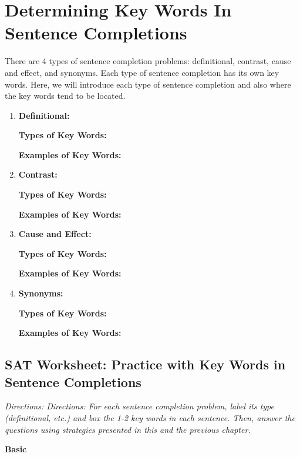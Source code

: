 \section{Determining Key Words In Sentence Completions}

There are 4 types of sentence completion problems: definitional, contrast, cause and effect, and
synonyms. Each type of sentence completion has its own key words. Here, we will introduce each
type of sentence completion and also where the key words tend to be located.

\begin{enumerate}

\vfill
\item \textbf{Definitional:}

\textbf{Types of Key Words:}

\textbf{Examples of Key Words:}

\vfill

\item \textbf{Contrast:}

\textbf{Types of Key Words:}

\textbf{Examples of Key Words:}

\vfill

\item \textbf{Cause and Effect:}

\textbf{Types of Key Words:}

\textbf{Examples of Key Words:}

\vfill

\item \textbf{Synonyms:}

\textbf{Types of Key Words:}

\textbf{Examples of Key Words:}

\end{enumerate} 

\pagebreak
\subsection{SAT Worksheet: Practice with Key Words in Sentence Completions}

\textit{Directions: Directions: For each sentence completion problem, label its type (definitional, etc.) and box the
1-2 key words in each sentence. Then, answer the questions using strategies presented in this and
the previous chapter.}

\textbf{Basic}

